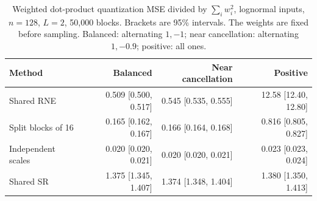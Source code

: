 \begin{table}[t]
\centering\footnotesize
\caption{Weighted dot-product quantization MSE divided by $\sum_iw_i^2$, lognormal inputs, $n=128$, $L=2$, 50,000 blocks. Brackets are 95\% intervals. The weights are fixed before sampling. Balanced: alternating $1,-1$; near cancellation: alternating $1,-0.9$; positive: all ones.}\label{tab:revision-weighted}
\begin{tabular}{@{}lrrr@{}}\toprule
Method & Balanced & Near cancellation & Positive\\\midrule
Shared RNE & 0.509 [0.500, 0.517] & 0.545 [0.535, 0.555] & 12.58 [12.40, 12.80]\\
Split blocks of 16 & 0.165 [0.162, 0.167] & 0.166 [0.164, 0.168] & 0.816 [0.805, 0.827]\\
Independent scales & 0.020 [0.020, 0.021] & 0.020 [0.020, 0.021] & 0.023 [0.023, 0.024]\\
Shared SR & 1.375 [1.345, 1.407] & 1.374 [1.348, 1.404] & 1.380 [1.350, 1.413]\\
\bottomrule\end{tabular}
\end{table}
